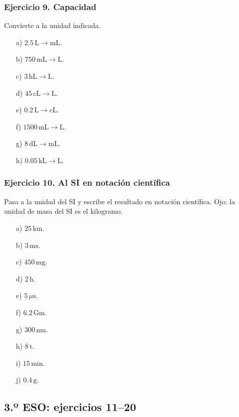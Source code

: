 \subsubsection*{Ejercicio 9. Capacidad}

Convierte a la unidad indicada.

\begin{enumerate}
    \item[a)] $2.5\,\mathrm{L}\rightarrow\mathrm{mL}$.
    \item[b)] $750\,\mathrm{mL}\rightarrow\mathrm{L}$.
    \item[c)] $3\,\mathrm{hL}\rightarrow\mathrm{L}$.
    \item[d)] $45\,\mathrm{cL}\rightarrow\mathrm{L}$.
    \item[e)] $0.2\,\mathrm{L}\rightarrow\mathrm{cL}$.
    \item[f)] $1500\,\mathrm{mL}\rightarrow\mathrm{L}$.
    \item[g)] $8\,\mathrm{dL}\rightarrow\mathrm{mL}$.
    \item[h)] $0.05\,\mathrm{kL}\rightarrow\mathrm{L}$.
\end{enumerate}

\subsubsection*{Ejercicio 10. Al SI en notación científica}

Pasa a la unidad del SI y escribe el resultado en notación científica.
Ojo: la unidad de masa del SI es el kilogramo.

\begin{enumerate}
    \item[a)] $25\,\mathrm{km}$.
    \item[b)] $3\,\mathrm{ms}$.
    \item[c)] $450\,\mathrm{mg}$.
    \item[d)] $2\,\mathrm{h}$.
    \item[e)] $5\,\mu\mathrm{s}$.
    \item[f)] $6.2\,\mathrm{Gm}$.
    \item[g)] $300\,\mathrm{nm}$.
    \item[h)] $8\,\mathrm{t}$.
    \item[i)] $15\,\mathrm{min}$.
    \item[j)] $0.4\,\mathrm{g}$.
\end{enumerate}

\subsection{3.º ESO: ejercicios 11--20}


